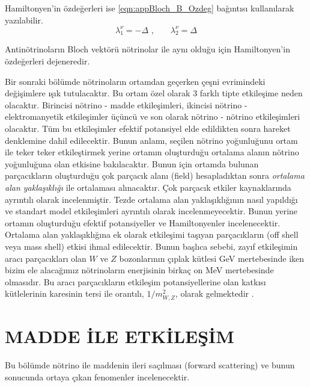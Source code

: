 Hamiltonyen'in özdeğerleri ise \eqref{eqn:appBloch_B_Ozdeg} bağıntısı kullanılarak yazılabilir.
\begin{equation}
	\lambda^{\nu}_{1} = -\Delta \text{ ,} \qquad \lambda^{\nu}_{2} = \Delta
\end{equation}

Antinötrinoların Bloch vektörü nötrinolar ile aynı olduğu için Hamiltonyen'in özdeğerleri dejeneredir.

Bir sonraki bölümde nötrinoların ortamdan geçerken çeşni evrimindeki değişimlere ışık tutulacaktır. Bu ortam özel olarak 3 farklı tipte etkileşime neden olacaktır. Birincisi nötrino - madde etkileşimleri, ikincisi nötrino - elektromanyetik etkileşimler üçüncü ve son olarak nötrino - nötrino etkileşimleri olacaktır. Tüm bu etkileşimler efektif potansiyel elde edildikten sonra hareket denklemine dahil edilecektir. Bunun anlamı, seçilen nötrino yoğunluğunu ortam ile teker teker etkileştirmek yerine ortamın oluşturduğu ortalama alanın nötrino yoğunluğuna olan etkisine bakılacaktır. Bunun için ortamda bulunan parçacıkların oluşturduğu çok parçacık alanı (field) hesapladıktan sonra \emph{ortalama alan yaklaşıklığı} ile ortalaması alınacaktır. Çok parçacık etkiler \cite{Vlasenko:2013fja,Birol:2018qhx} kaynaklarında ayrıntılı olarak incelenmiştir. Tezde ortalama alan yaklaşıklığının nasıl yapıldığı ve standart model etkileşimleri ayrıntılı olarak incelenmeyecektir. Bunun yerine ortamın oluşturduğu efektif potansiyeller ve Hamiltonyenler incelenecektir. Ortalama alan yaklaşıklığına ek olarak etkileşimi taşıyan parçacıkların (off shell veya mass shell) etkisi ihmal edilecektir. Bunun başlıca sebebi, zayıf etkileşimin aracı parçacıkları olan $ W $ ve $ Z $ bozonlarının çıplak kütlesi GeV mertebesinde iken bizim ele alacağımız nötrinoların enerjisinin birkaç on MeV mertebesinde olmasıdır. Bu aracı parçacıkların etkileşim potansiyellerine olan katkısı kütlelerinin karesinin tersi ile orantılı, $ 1/m^{2}_{W,Z} $, olarak gelmektedir \cite{Sigl:1993ctk}.

\newpage
\section{MADDE İLE ETKİLEŞİM}\label{sec:maddeIleEtkilesim}
\paragraph{}
Bu bölümde nötrino ile maddenin ileri saçılması (forward scattering) ve bunun sonucunda ortaya çıkan fenomenler incelenecektir.

